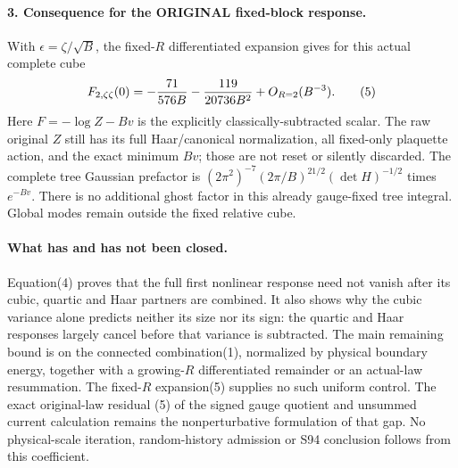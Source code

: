 \documentclass[11pt]{article}
\begin{document}
\paragraph{3. Consequence for the ORIGINAL fixed-block response.}
With $\epsilon=\zeta/\sqrt B$, the fixed-$R$ differentiated expansion gives
for this actual complete cube
\[
 F_{2,\zeta\zeta}(0)
   =-{71\over576B}-{119\over20736B^2}+O_{R=2}(B^{-3}).              \tag{5}
\]
Here $F=-\log Z-Bv$ is the explicitly classically-subtracted scalar.
The raw original $Z$ still has its full Haar/canonical normalization,
all fixed-only plaquette action, and the exact minimum $Bv$; those are not
reset or silently discarded. The complete tree Gaussian prefactor is
$(2\pi^2)^{-7}(2\pi/B)^{21/2}(\det H)^{-1/2}$ times $e^{-Bv}$.
There is no additional ghost factor in this already gauge-fixed tree
integral. Global modes remain outside the fixed relative cube.

\paragraph{What has and has not been closed.}
Equation(4) proves that the full first nonlinear response need not vanish
after its cubic, quartic and Haar partners are combined. It also shows why
the cubic variance alone predicts neither its size nor its sign: the
quartic and Haar responses largely cancel before that variance is subtracted.
The main remaining bound is on the connected combination(1), normalized
by physical boundary energy, together with a growing-$R$ differentiated
remainder or an actual-law resummation. The fixed-$R$ expansion(5) supplies
no such uniform control. The exact original-law residual (5) of the signed gauge quotient and unsummed current calculation remains the
nonperturbative formulation of that gap. No physical-scale iteration,
random-history admission or S94 conclusion follows from this coefficient.
\end{document}
